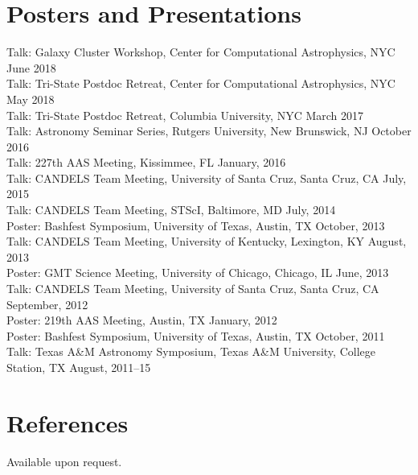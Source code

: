 \documentclass[margin,line, 11pt]{res}
\begin{document}
\begin{resume}
\section{\sc Posters and Presentations}
Talk: Galaxy Cluster Workshop, Center for Computational Astrophysics, NYC June 2018\\
Talk: Tri-State Postdoc Retreat, Center for Computational Astrophysics, NYC May 2018\\
Talk: Tri-State Postdoc Retreat, Columbia University, NYC March 2017\\
Talk: Astronomy Seminar Series, Rutgers University, New Brunswick, NJ October 2016\\
Talk: 227th AAS Meeting, Kissimmee, FL January, 2016\\
Talk: CANDELS Team Meeting, University of Santa Cruz, Santa Cruz, CA July, 2015\\
Talk: CANDELS Team Meeting, STScI, Baltimore, MD July, 2014\\
Poster: Bashfest Symposium, University of Texas, Austin, TX October, 2013\\
Talk: CANDELS Team Meeting, University of Kentucky, Lexington, KY August, 2013\\
Poster: GMT Science Meeting, University of Chicago, Chicago, IL June, 2013\\
Talk: CANDELS Team Meeting, University of Santa Cruz, Santa Cruz, CA September, 2012\\
Poster: 219th AAS Meeting, Austin, TX January, 2012\\
Poster: Bashfest Symposium, University of Texas, Austin, TX October, 2011\\
Talk: Texas A\&M Astronomy Symposium, Texas A\&M University, College Station, TX August, 2011--15\\

\section{\sc References}
Available upon request.


\end{resume}
\end{document}
